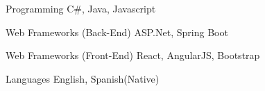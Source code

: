 


\begin{cvskills}


\cvskill
{Programming} %
{C\#, Java, Javascript} %


\cvskill
{Web Frameworks (Back-End)} %
{ASP.Net, Spring Boot} %

\cvskill
{Web Frameworks (Front-End)} %
{React, AngularJS, Bootstrap} %


\cvskill
{Languages} %
{English, Spanish(Native)} %

\end{cvskills}